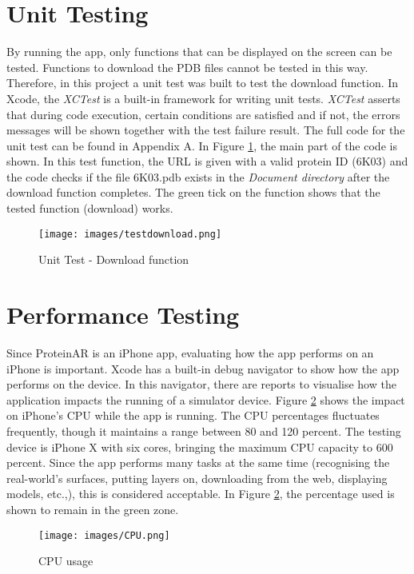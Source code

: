 \section{Unit Testing}
By running the app, only functions that can be displayed on the screen can be tested. Functions to download the PDB files cannot be tested in this way. Therefore, in this project a unit test was built to test the download function. 
In Xcode, the \emph{XCTest} is a built-in framework for writing unit tests. \emph{XCTest} asserts that during code execution, certain conditions are satisfied and if not, the errors messages will be shown together with the test failure result. 
The full code for the unit test can be found in Appendix A. In Figure \ref{fig:testdownload}, the main part of the code is shown. In this test function, the URL is given with a valid protein ID (6K03) and the code checks if the file 6K03.pdb exists in the \emph{Document directory} after the download function completes. The green tick on the function shows that the tested function (download) works. 

 \begin{figure}[!htp]
	\centering
	\texttt{[image: images/testdownload.png]}
	\caption{Unit Test - Download function}
	\label{fig:testdownload}
\end{figure}

\section{Performance Testing}
Since ProteinAR is an iPhone app, evaluating how the app performs on an iPhone is important. Xcode has a built-in debug navigator to show how the app performs on the device. In this navigator, there are reports to visualise how the application impacts the running of a simulator device. 
Figure \ref{fig:cpu} shows the impact on iPhone's CPU while the app is running. The CPU percentages fluctuates frequently, though it maintains a range between 80 and 120 percent. The testing device is iPhone X with six cores, bringing the maximum CPU capacity to 600 percent. Since the app performs many tasks at the same time (recognising the real-world's surfaces, putting layers on, downloading from the web, displaying models, etc.,), this is considered acceptable. In Figure \ref{fig:cpu}, the percentage used is shown to remain in the green zone. 
 \begin{figure}[!htp]
	\centering
	\texttt{[image: images/CPU.png]}
	\caption{CPU usage}
	\label{fig:cpu}
\end{figure}

